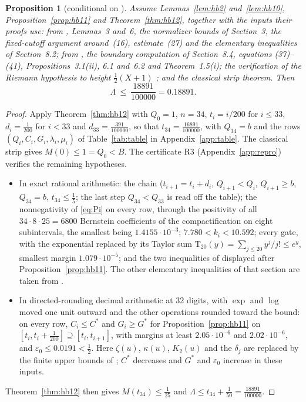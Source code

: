 \documentclass[11pt]{article}
\newtheorem{proposition}[theorem]{Proposition}
\theoremstyle{definition}
\theoremstyle{remark}
\numberwithin{equation}{section}
\begin{document}
\begin{proposition}[conditional on \cite{hb}]\label{prop:table}
Assume Lemmas~\ref{lem:hb2} and~\ref{lem:hb10},
Proposition~\ref{prop:hb11} and Theorem~\ref{thm:hb12}, together with the
inputs their proofs use: from \cite{hb}, Lemmas~3 and~6, the normalizer
bounds of Section~3, the fixed-cutoff argument around~(16), estimate~(27)
and the elementary inequalities of Section~8.2; from \cite{polymath}, the
boundary computation of Section~8.4, equations (37)--(41),
Propositions~3.1(ii), 6.1 and~6.2 and Theorem~1.5(i); the verification of
the Riemann hypothesis to height $\frac12(X+1)$ \cite{platt2017}; and the
classical strip theorem. Then
\[
\Lambda\ \le\ \frac{18891}{100000}=0.18891 .
\]
\end{proposition}

\begin{proof}
Apply Theorem~\ref{thm:hb12} with $Q_0=1$, $n=34$, $t_i=i/200$ for
$i\le33$, $d_i=\frac1{200}$ for $i<33$ and $d_{33}=\frac{391}{100000}$, so
that $t_{34}=\frac{16891}{100000}$, with $Q_{34}=b$ and the rows
$(Q_i,C_i,G_i,\lambda_i,\mu_i)$ of Table~\ref{tab:table} in
Appendix~\ref{app:table}. The classical strip gives $M(0)\le1=Q_0<B$. The
certificate R3 (Appendix~\ref{app:repro}) verifies the remaining
hypotheses.
\begin{itemize}
\item In exact rational arithmetic: the chain ($t_{i+1}=t_i+d_i$,
$Q_{i+1}<Q_i$, $Q_{i+1}\ge b$, $Q_{34}=b$, $t_{34}\le\frac15$; the last
step $Q_{34}<Q_{33}$ is read off the table); the
nonnegativity of \eqref{eq:Pi} on every row, through the positivity of all
$34\cdot8\cdot25=6800$ Bernstein coefficients of the compactification
\cite[(34)--(35)]{hb} on eight subintervals, the smallest being
$1.4155\cdot10^{-3}$; $7.780<k_i<10.592$; every gate, with the
exponential replaced by its Taylor sum $\mathrm T_{20}(y)=\sum_{j\le20}y^j/j!\le e^y$,
smallest margin $1.079\cdot10^{-5}$; and the two inequalities of
\cite[Section~8.2]{hb} displayed after Proposition~\ref{prop:hb11}. The
other elementary inequalities of that section are taken from \cite{hb}.
\item In directed-rounding decimal arithmetic at 32 digits, with $\exp$ and
$\log$ moved one unit outward and the other operations rounded toward the
bound: on every row, $C_i\le C^*$ and $G_i\ge G^*$ for
Proposition~\ref{prop:hb11} on $[t_i,t_i+\frac1{200}]\supseteq[t_i,t_{i+1}]$,
with margins at least $2.05\cdot10^{-6}$ and $2.02\cdot10^{-6}$, and
$\varepsilon_0\le0.0191<\frac12$. Here $\zeta(u)$, $\kappa(u)$, $K_2(u)$ and
the $\delta_j$ are replaced by the finite upper bounds of
\cite[Section~8.2]{hb}; $C^*$ decreases and $G^*$ and $\varepsilon_0$
increase in these inputs.
\end{itemize}
Theorem~\ref{thm:hb12} then gives $M(t_{34})\le\frac1{25}$ and
$\Lambda\le t_{34}+\frac1{50}=\frac{18891}{100000}$.
\end{proof}
\end{document}
